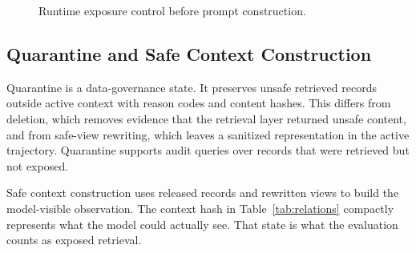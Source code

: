 \documentclass[conference]{IEEEtran}
\begin{document}
\begin{figure}[t]
\caption{Runtime exposure control before prompt construction.}
\label{alg:flowfence}
\centering
\scriptsize
{}
\end{figure}

\subsection{Quarantine and Safe Context Construction}

Quarantine is a data-governance state. It preserves unsafe retrieved records outside active context with reason codes and content hashes. This differs from deletion, which removes evidence that the retrieval layer returned unsafe content, and from safe-view rewriting, which leaves a sanitized representation in the active trajectory. Quarantine supports audit queries over records that were retrieved but not exposed.

Safe context construction uses released records and rewritten views to build the model-visible observation. The context hash in Table~\ref{tab:relations} compactly represents what the model could actually see. That state is what the evaluation counts as exposed retrieval.
\end{document}
